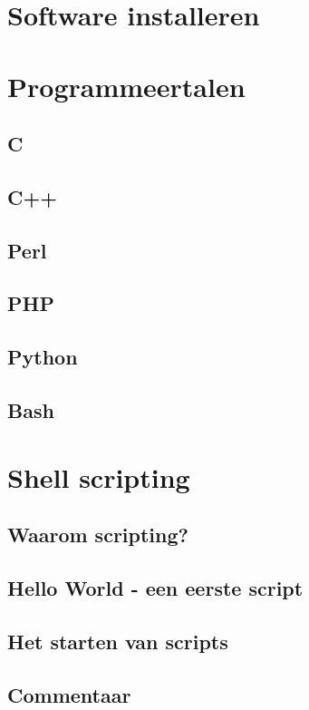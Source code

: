 \documentclass[a4paper,12pt,twoside,openright,titlepage]{book}
\begin{document}
\chapter{Software installeren}

\chapter{Programmeertalen}

\section{C}
\section{C++}
\section{Perl}
\section{PHP}
\section{Python}
\section{Bash}

\chapter{Shell scripting}

\section{Waarom scripting?}

\section{Hello World - een eerste script}

\section{Het starten van scripts}

\section{Commentaar}

\end{document}
